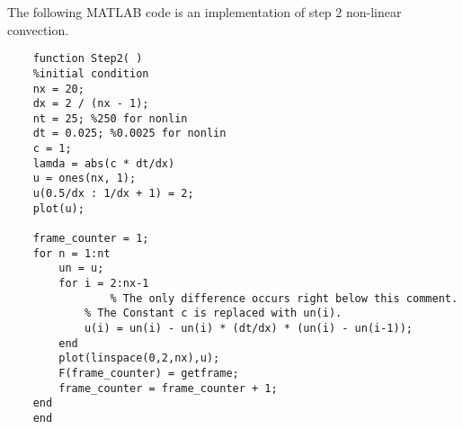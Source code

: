 \documentclass[paper=a4, fontsize=11pt]{scrartcl} %
\numberwithin{equation}{section} %
\numberwithin{figure}{section} %
\numberwithin{table}{section} %
\begin{document}
    The following MATLAB code is an implementation of step $2$ non-linear convection.  
   
    \begin{lstlisting}
    function Step2( )
    %initial condition
    nx = 20;
    dx = 2 / (nx - 1);
    nt = 25; %250 for nonlin
    dt = 0.025; %0.0025 for nonlin
    c = 1;
    lamda = abs(c * dt/dx)
    u = ones(nx, 1);
    u(0.5/dx : 1/dx + 1) = 2;
    plot(u);
     
    frame_counter = 1;
    for n = 1:nt
        un = u;
        for i = 2:nx-1
                % The only difference occurs right below this comment.
            % The Constant c is replaced with un(i).  
            u(i) = un(i) - un(i) * (dt/dx) * (un(i) - un(i-1));
        end
        plot(linspace(0,2,nx),u);
        F(frame_counter) = getframe;
        frame_counter = frame_counter + 1;
    end
    end
    \end{lstlisting}
     
     
    
\end{document}

